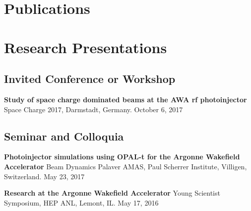 \documentclass[11pt,a4paper,sans]{moderncv}        %
\begin{document}
\section{Publications}
%




\section{Research Presentations}

\subsection{Invited Conference or Workshop} %
\textbf{Study of space charge dominated beams at the AWA rf photoinjector}\newline
Space Charge 2017, Darmstadt, Germany. October 6, 2017

\subsection{Seminar and Colloquia}
\textbf{Photoinjector simulations using OPAL-t for the Argonne Wakefield Accelerator}\newline
Beam Dynamics Palaver AMAS, Paul Scherrer Institute, Villigen, Switzerland. May 23, 2017 
\vspace{0.3em}

\textbf{Research at the Argonne Wakefield Accelerator}\newline
Young Scientist Symposium, HEP ANL, Lemont, IL. May 17, 2016 
\vspace{0.3em}
\end{document}
